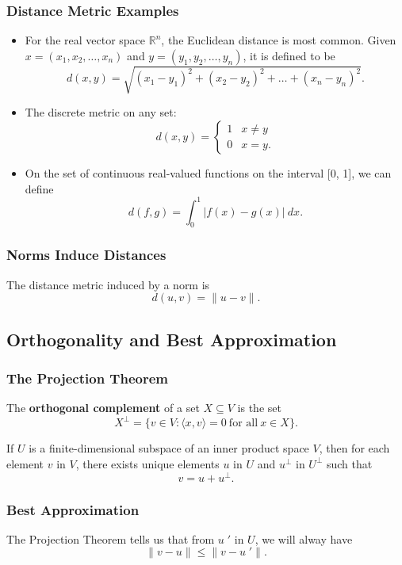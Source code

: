 \documentclass{beamer}
\begin{document}
\begin{frame}
\frametitle{Distance Metric Examples}

\begin{itemize}
\item For the real vector space $\mathbb{R}^n$, the Euclidean distance is most common. Given $x = \left(x_1, x_2, \ldots, x_n\right)$ and $y = (y_1, y_2, \ldots, y_n)$, it is defined to be
$$
d(x, y)= \sqrt{(x_1 - y_1)^2 + (x_2 - y_2)^2 +\ldots + (x_n -y_n)^2}.
$$
\item The discrete metric on any set:
$$
d(x, y) = \begin{cases} 1	&	x \neq y\\ 0	&	x = y.\end{cases}
$$
\item On the set of continuous real-valued functions on the interval [0, 1], we can define
$$
d(f, g) = \int_0^1 \left| f(x) - g(x)\right|\ dx.
$$
\end{itemize}

\end{frame}

\begin{frame}
\frametitle{Norms Induce Distances}
The distance metric induced by a norm is
$$
d(u, v) = \| u - v\|.
$$
\end{frame}


\subsection{Orthogonality and Best Approximation}

\begin{frame}
\frametitle{The Projection Theorem}
\begin{Definition}
The {\bf orthogonal complement} of a set $X\subseteq V$ is the set
$$
X^\perp = \{v \in V: \langle x, v\rangle = 0\ \text{for all}\ x\in X\}.
$$
\end{Definition}

\begin{Theorem}
If $U$ is a finite-dimensional subspace of an inner product space $V$, then for each element $v$ in $V$, there exists unique elements $u$ in $U$ and $u^\perp$ in $U^\perp$ such that
$$
v = u + u^\perp.
$$
\end{Theorem}
\end{frame}

\begin{frame}
\frametitle{Best Approximation}
The Projection Theorem tells us that from $u\; '$ in $U$, we will alway have
$$
\| v - u\| \leq \| v - u\; '\|.
$$

\end{frame}
\end{document}

